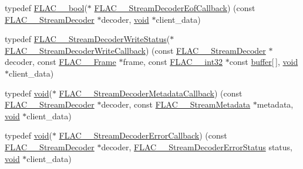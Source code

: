 \begin{DoxyCompactItemize}
\item 
typedef \mbox{\hyperlink{ordinals_8h_a95103469f1cbd78b8cf250194985b34e}{F\+L\+A\+C\+\_\+\+\_\+bool}}($\ast$ \mbox{\hyperlink{group__flac__stream__decoder_ga4eac094fc609363532d90cf8374b4f7e}{F\+L\+A\+C\+\_\+\+\_\+\+Stream\+Decoder\+Eof\+Callback}}) (const \mbox{\hyperlink{struct_f_l_a_c_____stream_decoder}{F\+L\+A\+C\+\_\+\+\_\+\+Stream\+Decoder}} $\ast$decoder, \mbox{\hyperlink{_s_d_l__opengles2__gl2ext_8h_ae5d8fa23ad07c48bb609509eae494c95}{void}} $\ast$client\+\_\+data)
\item 
typedef \mbox{\hyperlink{group__flac__stream__decoder_ga73f67eb9e0ab57945afe038751bc62c8}{F\+L\+A\+C\+\_\+\+\_\+\+Stream\+Decoder\+Write\+Status}}($\ast$ \mbox{\hyperlink{group__flac__stream__decoder_ga61e48dc2c0d2f6c5519290ff046874a4}{F\+L\+A\+C\+\_\+\+\_\+\+Stream\+Decoder\+Write\+Callback}}) (const \mbox{\hyperlink{struct_f_l_a_c_____stream_decoder}{F\+L\+A\+C\+\_\+\+\_\+\+Stream\+Decoder}} $\ast$decoder, const \mbox{\hyperlink{struct_f_l_a_c_____frame}{F\+L\+A\+C\+\_\+\+\_\+\+Frame}} $\ast$frame, const \mbox{\hyperlink{ordinals_8h_a33fd77bfe6d685541a0c034a75deccdc}{F\+L\+A\+C\+\_\+\+\_\+int32}} $\ast$const \mbox{\hyperlink{_s_d_l__opengl__glext_8h_a76461e97a098d2c9ae20ac193d3825ae}{buffer}}\mbox{[}$\,$\mbox{]}, \mbox{\hyperlink{_s_d_l__opengles2__gl2ext_8h_ae5d8fa23ad07c48bb609509eae494c95}{void}} $\ast$client\+\_\+data)
\item 
typedef \mbox{\hyperlink{_s_d_l__opengles2__gl2ext_8h_ae5d8fa23ad07c48bb609509eae494c95}{void}}($\ast$ \mbox{\hyperlink{group__flac__stream__decoder_ga6aa87c01744c1c601b7f371f627b6e14}{F\+L\+A\+C\+\_\+\+\_\+\+Stream\+Decoder\+Metadata\+Callback}}) (const \mbox{\hyperlink{struct_f_l_a_c_____stream_decoder}{F\+L\+A\+C\+\_\+\+\_\+\+Stream\+Decoder}} $\ast$decoder, const \mbox{\hyperlink{struct_f_l_a_c_____stream_metadata}{F\+L\+A\+C\+\_\+\+\_\+\+Stream\+Metadata}} $\ast$metadata, \mbox{\hyperlink{_s_d_l__opengles2__gl2ext_8h_ae5d8fa23ad07c48bb609509eae494c95}{void}} $\ast$client\+\_\+data)
\item 
typedef \mbox{\hyperlink{_s_d_l__opengles2__gl2ext_8h_ae5d8fa23ad07c48bb609509eae494c95}{void}}($\ast$ \mbox{\hyperlink{group__flac__stream__decoder_gac896ee6a12668e9015fab4fbc6aae996}{F\+L\+A\+C\+\_\+\+\_\+\+Stream\+Decoder\+Error\+Callback}}) (const \mbox{\hyperlink{struct_f_l_a_c_____stream_decoder}{F\+L\+A\+C\+\_\+\+\_\+\+Stream\+Decoder}} $\ast$decoder, \mbox{\hyperlink{group__flac__stream__decoder_ga130e70bd9a73d3c2416247a3e5132ecf}{F\+L\+A\+C\+\_\+\+\_\+\+Stream\+Decoder\+Error\+Status}} status, \mbox{\hyperlink{_s_d_l__opengles2__gl2ext_8h_ae5d8fa23ad07c48bb609509eae494c95}{void}} $\ast$client\+\_\+data)
\end{DoxyCompactItemize}
